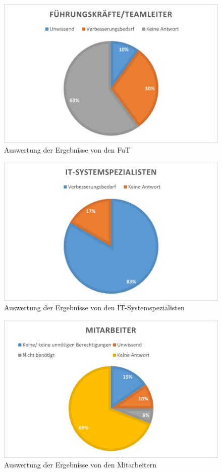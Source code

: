 \begin{figure}[h!]
 \centering
 \includegraphics[width=1\textwidth]{gfx/Picture/FuT.PNG}
 \caption{Auswertung der Ergebnisse von den FuT}
 \label{fig:Fut}
\end{figure}
\begin{figure}[h!]
 \centering
 \includegraphics[width=1\textwidth]{gfx/Picture/IT.PNG}
 \caption{Auswertung der Ergebnisse von den IT-Systemspezialisten}
 \label{fig:IT}
\end{figure}
\begin{figure}[h!]
 \centering
 \includegraphics[width=1\textwidth]{gfx/Picture/Mitarbeiter.PNG}
 \caption{Auswertung der Ergebnisse von den Mitarbeitern}
 \label{fig:Mit}
\end{figure}
